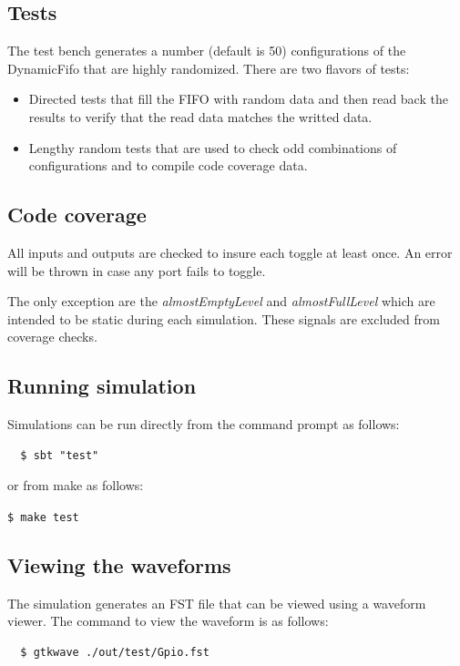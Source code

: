 \documentclass{article}
\begin{document}
\subsection{Tests}
The test bench generates a number (default is 50) configurations of the
DynamicFifo that are highly randomized. There are two flavors of tests:

\begin{itemize}
  \item {Directed tests that fill the FIFO with random data and then read back
        the results to verify that the read data matches the writted data.}
  \item {Lengthy random tests that are used to check odd combinations of
        configurations and to compile code coverage data.}
\end{itemize}

\subsection{Code coverage}
All inputs and outputs are checked to insure each toggle at least once. An error
will be thrown in case any port fails to toggle.

The only exception are the \emph{almostEmptyLevel} and \emph{almostFullLevel}
which are intended to be static during each simulation. These signals are
excluded from coverage checks.

\subsection{Running simulation}

Simulations can be run directly from the command prompt as follows:

\begin{verbatim}
  $ sbt "test"
\end{verbatim}

or from make as follows:

\texttt{\$ make test}

\subsection{Viewing the waveforms}

The simulation generates an FST file that can be viewed using a waveform viewer. The command to view the waveform is as follows:
\begin{verbatim}
  $ gtkwave ./out/test/Gpio.fst
\end{verbatim}
\end{document}
